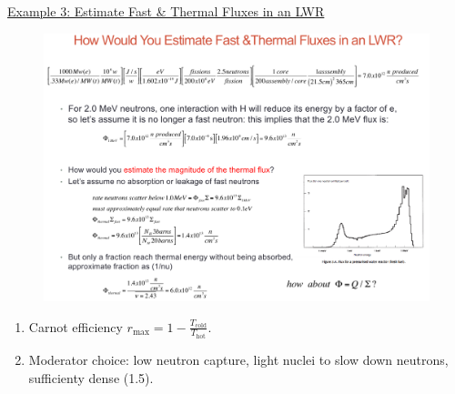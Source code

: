 \documentclass{school-22.211-notes}
\begin{document}
\uline{Example 3: Estimate Fast \& Thermal Fluxes in an LWR}
\begin{figure}[ht]
  \centering
  \includegraphics[width=4.5in]{images/lec1-example3.png}
\end{figure}

\clearpage
\begin{enumerate}
\item Carnot efficiency $r_{\mathrm{max}} = 1 - \frac{T_{\mathrm{cold}}}{T_{\mathrm{hot}}}$. 
\item Moderator choice: low neutron capture, light nuclei to slow down neutrons, sufficienty dense (1.5). 
\end{enumerate}
\end{document}
